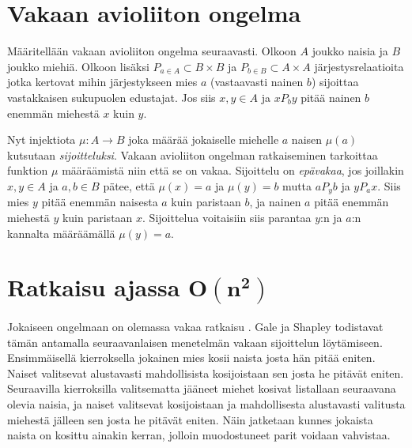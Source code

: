\documentclass[gradu, twoside]{tktltiki}
\begin{document}
\title{}
\author{Jani Rahkola}
\date{\today}
\level{}

\maketitle

\doublespacing

\subject{Tietojenkäsittelytiede}

\mytableofcontents

\section{Vakaan avioliiton ongelma}

Määritellään vakaan avioliiton ongelma seuraavasti. Olkoon $A$
joukko naisia ja $B$ joukko miehiä. Olkoon lisäksi $P_{a \in A}
\subset B \times B$ ja $P_{b \in B} \subset A \times A$
järjestysrelaatioita jotka kertovat mihin järjestykseen mies $a$
(vastaavasti nainen $b$) sijoittaa vastakkaisen sukupuolen
edustajat. Jos siis $x,y \in A$ ja $xP_by$ pitää nainen $b$
enemmän miehestä $x$ kuin $y$.

Nyt injektiota $\mu : A \rightarrow B$ joka määrää jokaiselle
miehelle $a$ naisen $\mu(a)$ kutsutaan \emph{sijoitteluksi}.
Vakaan avioliiton ongelman ratkaiseminen tarkoittaa funktion $\mu$
määräämistä niin että se on vakaa. Sijoittelu on \emph{epävakaa}, jos
joillakin $x, y \in A$ ja $a, b \in B$ pätee, että $\mu(x) = a$
ja $\mu(y) = b$ mutta $aP_yb$ ja $yP_ax$. Siis mies $y$ pitää
enemmän naisesta $a$ kuin paristaan $b$, ja nainen $a$ pitää
enemmän miehestä $y$ kuin paristaan $x$. Sijoittelua voitaisiin
siis parantaa $y$:n ja $a$:n kannalta määräämällä $\mu(y) = a$.

\section{Ratkaisu ajassa $\boldsymbol{O(n^2)}$}

Jokaiseen ongelmaan on olemassa vakaa ratkaisu \cite{galeshapley62}.
Gale ja Shapley todistavat tämän antamalla seuraavanlaisen menetelmän
vakaan sijoittelun löytämiseen. Ensimmäisellä kierroksella jokainen
mies kosii naista josta hän pitää eniten. Naiset valitsevat
alustavasti mahdollisista kosijoistaan sen josta he pitävät eniten.
Seuraavilla kierroksilla valitsematta jääneet miehet kosivat
listallaan seuraavana olevia naisia, ja naiset valitsevat kosijoistaan
ja mahdollisesta alustavasti valitusta miehestä jälleen sen josta he
pitävät eniten. Näin jatketaan kunnes jokaista naista on kosittu
ainakin kerran, jolloin muodostuneet parit voidaan vahvistaa.
\end{document}
